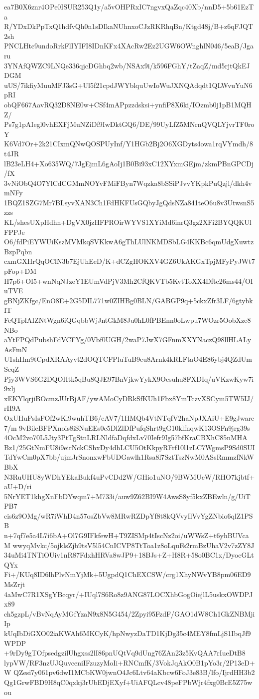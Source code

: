 ea7B0X6znr4OPe0ISUR253Q1y/a5vOHPRxIC7ngvxQaZqc40Xb/nnD5+5b61EzTa
R/YDxDkPpTxQ1hdfvQh0n1sDIkaNUhnxoCJzRKRhqBn/Ktgd48j/B+z6qFJQT2sh
PNCLHtc9undoRrkFlIYIFI8IDnKFx4XAcRw2Ez2UGW6OWnghlN046/5eaB/Jgaru
3YNAfQWZC9LNQe336qjcDGhbq2wb/NSAx9i/k596FGhY/tZaqZ/md5rjtQkEJDGM
uUS/7ikfiyMuuMFJ3sG+Ul5f21cpdJWYblquUwIoWuJXNQAdqdt1QLWvuYuN6pRI
obQF667AavRQ32D8NE0w+CSf4mAPpzzdsksi+ynfiP8X6ki/IOzmb0j1pB1MQHZ/
Ps7g1pAIegl0vhEXFjMuNZiDf9IwDktGQ6/DE/99UyLfZ5MNrnQVQLYjvrTF0roY
K6Vd7Or+2k21CIxmQNwQOSPUyInf/Y1HGb2Bj2O6XGDyts4owa1rqVYmdh/8t4JR
lB23eLH4+Xo635WQ/7JgEjmL6gAoIj1B0Bi93xC12XYxmGEjm/zkmPBnGPCDj/fX
3vNiObQ4O7YlCdCGMmNOYvFMiFByn7Wqzka8bSSiPJvvYKpkPuQzjl/dkh4vmNFy
1BQZ1SZG7Mr7BLsyvXAN3Ch1FdHKFUsGQbyJgQdsNZa841teO6u8v3UtwsnS5zzs
KL/shesUXpHdhn+DgVX0jzHFPROirWYVS1XYiMd6inrQ3gz2XFi2BYQQKUlFPPJe
O6/fdPiEYWUiKszMVMkqSVKkwA6gThLUlNKMDSbLG4KKBc6qmUdgXuwtzBzpPqbn
cxmGXHrQqOClN3b7EjUhEeD/K+dCZgHOKXV4GZ6UkAKGxTpjMFyPyJWt7pFop+DM
H7p6+OI5+wnNqNJzeY1EUmVdPjV3Mh2CfQKVTb5KvtToXX4Dftc26ms44/OIuTVE
gBNjZKfgc/EnO8E+2G5DIL771w0ZIHBg0BLN/GABGP9q+5ckxZfr3LF/6gtybkIT
FeQTplAIZNtWgn6iQGqbbWjJntGkM8Ju0hL0fPBEnn0oLwpu7WOzr5OobXze8NBo
aYtFPQdPubshFdVCFYg/0Vbf0UGH/2waP7JwX7GFnmXXYNaczQ98llHLALyAsFmN
U1shHm9tCpdXRAAyvt2dOQTCFPluTuB9eu8Arnk4kRLFtaO4E86ybj4QZdUmSeqZ
Pjy3WVS6G2DQOHtk5qBu8QJE97BnVjkwYykX9Ocsuhu8FXDIq/uVKzwKyw7i9xlj
xEKYlqrjiBOcmzJUrBjAF/ywAMoCyDRkSfKUh1Fbx8YmTczvXSCym5TW5IJ/rH9A
OxUHuPsIsFOf2wKl9wuhTB6/eAV7/1HMQb4VtNTqfV2haNpJXAiU+E9gJware7/m
9vBileBFPXnois8iSNuEEs0c5DlZlDfPufqShrt9gG10klfnqwK13OSFn9jrg39s
4OcM2vo70L5Jty3PtTgStnLRLNldfaDqfdxLv70Iefr9Ig57bfKraCBXhC85nMHA
Bz1/25GtNmFU8i9eirNckCShxDy4dhLCU5OtKkpyRFrf10l1zLC7WgmsP9Sd0SUI
TdYwCm0pX7bb/ujmJrSnonxwFbUDGawlh1Rsa8l7SztTszNwM0ASsRmmzfNkWBbX
N3RuUHU8yWDhYEkaBukf4uPvCDd2W/GHio1uNO/9BWMUcW/RHO7kjbtf+aU+D/ri
5NrYET1khgXnFbDYwqm7+M733i/auw9Z62BI9W4AwsS8yf5kxZBEwln/g/UiTPB7
cis6z9OMg/wR7iWhD4n57osZbVw8MRwRZDpYf8t8kQVvyIlVvYgZNbio6qlZ1PSB
n+7qf7e5a4L7i6bA+Ol7G9IFkfewH+T9ZISMp4tIscNz2oi/uWWsZ+t6yhBUVcaM
wwyqMvkc/5ojklsZjb9tsV5l54CnICVP8TtToa1z8oLquFs2rmBzUhaV2v7zZY8J
34uMi4TNTiOUiv1nR87FdxhHRVa8wJP9+18BJs+Z+H8R+58o0BC1x/DyocGLtQYx
Fi+/KUq8ID6lhPlvNmYjMk+5UgpdQ1ChEXCSW/crg1XhyNWvYB8pm06ED9MsZrjt
4aMwC7R1XSgYBcqyr/+IUql7S6Ro8z9ANG87LOCXhbGogOiejlL5uskxOWDPJx89
ch5gzpL/vBvNqAyMGfYzaN9x8N5G454/2Zpyi95FzdF/GAO1dW8Ch1GkZNBMjiIp
kUqIbDiGXO02iaKWAh6MKCyK/hpNwyzDaTD1KjDg35c4MEY8fmLjS1IbqJf9WPDP
+9rDy9gTOfpsedgzilUhgxss2lI86pnUQtVq9dUng76ZAn23z5KvQAA7rIueDtB8
lypVW/RF3nzUJQuvceniIFzuzyMoIi+RNCmfK/3VokJqAkO0B1pYo3r/2P13eD+W
QZesi7y061pv6dwI1MCbKW0jwnO4Jc6Ltv64aKbcw6FoJ3e83B/lfo/IjrdHH3b2
Qg1GrwFBD9H8qC0qxkj3rUbEDjEXyf+UiAFQLcv48peFPbWjr4fxg0BcE5Z75wou
